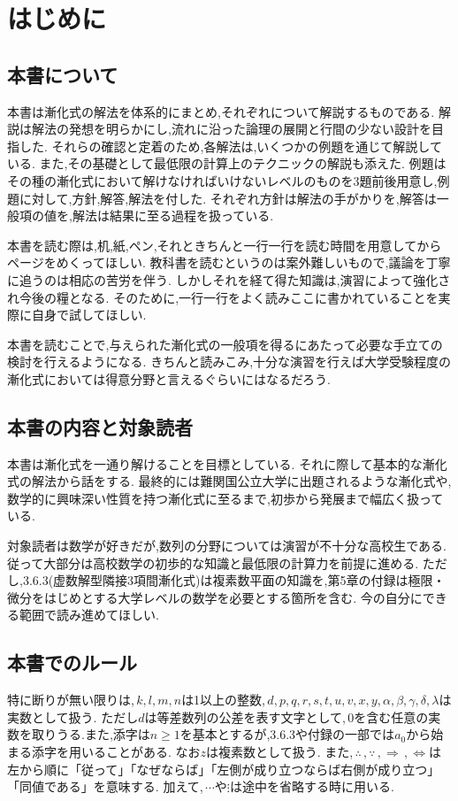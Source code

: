 
\section{はじめに}
  \subsection{本書について}
    本書は漸化式の解法を体系的にまとめ,それぞれについて解説するものである.
    解説は解法の発想を明らかにし,流れに沿った論理の展開と行間の少ない設計を目指した.
    それらの確認と定着のため,各解法は,いくつかの例題を通じて解説している.
    また,その基礎として最低限の計算上のテクニックの解説も添えた.
    例題はその種の漸化式において解けなければいけないレベルのものを3題前後用意し,例題に対して,方針,解答,解法を付した.
    それぞれ方針は解法の手がかりを,解答は一般項の値を,解法は結果に至る過程を扱っている.

    本書を読む際は,机,紙,ペン,それときちんと一行一行を読む時間を用意してからページをめくってほしい.
    教科書を読むというのは案外難しいもので,議論を丁寧に追うのは相応の苦労を伴う.
    しかしそれを経て得た知識は,演習によって強化され今後の糧となる.
    そのために,一行一行をよく読みここに書かれていることを実際に自身で試してほしい.

    本書を読むことで,与えられた漸化式の一般項を得るにあたって必要な手立ての検討を行えるようになる.
    きちんと読みこみ,十分な演習を行えば大学受験程度の漸化式においては得意分野と言えるぐらいにはなるだろう.     

  \subsection{本書の内容と対象読者}
    本書は漸化式を一通り解けることを目標としている.
    それに際して基本的な漸化式の解法から話をする.
    最終的には難関国公立大学に出題されるような漸化式や,数学的に興味深い性質を持つ漸化式に至るまで,初歩から発展まで幅広く扱っている.
    
    対象読者は数学が好きだが,数列の分野については演習が不十分な高校生である.
    従って大部分は高校数学の初歩的な知識と最低限の計算力を前提に進める.
    ただし,3.6.3(虚数解型隣接3項間漸化式)は複素数平面の知識を,第5章の付録は極限・微分をはじめとする大学レベルの数学を必要とする箇所を含む.
    今の自分にできる範囲で読み進めてほしい.

  \subsection{本書でのルール}
    特に断りが無い限りは,\,$k,l,m,n$は1以上の整数,\,$d,p,q,r,s,t,u,v,x,y,\alpha,\beta,\gamma,\delta,\lambda$は実数として扱う.
    ただし$d$は等差数列の公差を表す文字として,\,$0$を含む任意の実数を取りうる.また,添字は$n\ge1$を基本とするが,3.6.3や付録の一部では$a_0$から始まる添字を用いることがある.
    なお$z$は複素数として扱う.
    また,\,$\therefore\,,\because\,,\Rightarrow\,,\Leftrightarrow$は左から順に「従って」「なぜならば」「左側が成り立つならば右側が成り立つ」「同値である」を意味する.
    加えて,\,$\cdots$や$\vdots$は途中を省略する時に用いる.
    
